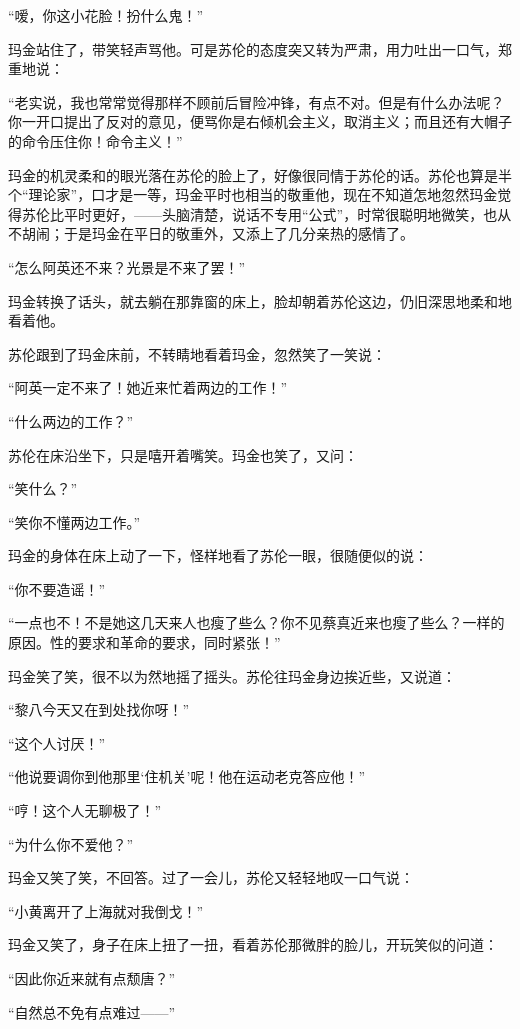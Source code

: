 \par “嗳，你这小花脸！扮什么鬼！”
\par 玛金站住了，带笑轻声骂他。可是苏伦的态度突又转为严肃，用力吐出一口气，郑重地说：
\par “老实说，我也常常觉得那样不顾前后冒险冲锋，有点不对。但是有什么办法呢？你一开口提出了反对的意见，便骂你是右倾机会主义，取消主义；而且还有大帽子的命令压住你！命令主义！”
\par 玛金的机灵柔和的眼光落在苏伦的脸上了，好像很同情于苏伦的话。苏伦也算是半个“理论家”，口才是一等，玛金平时也相当的敬重他，现在不知道怎地忽然玛金觉得苏伦比平时更好，——头脑清楚，说话不专用“公式”，时常很聪明地微笑，也从不胡闹；于是玛金在平日的敬重外，又添上了几分亲热的感情了。
\par “怎么阿英还不来？光景是不来了罢！”
\par 玛金转换了话头，就去躺在那靠窗的床上，脸却朝着苏伦这边，仍旧深思地柔和地看着他。
\par 苏伦跟到了玛金床前，不转睛地看着玛金，忽然笑了一笑说：
\par “阿英一定不来了！她近来忙着两边的工作！”
\par “什么两边的工作？”
\par 苏伦在床沿坐下，只是嘻开着嘴笑。玛金也笑了，又问：
\par “笑什么？”
\par “笑你不懂两边工作。”
\par 玛金的身体在床上动了一下，怪样地看了苏伦一眼，很随便似的说：
\par “你不要造谣！”
\par “一点也不！不是她这几天来人也瘦了些么？你不见蔡真近来也瘦了些么？一样的原因。性的要求和革命的要求，同时紧张！”
\par 玛金笑了笑，很不以为然地摇了摇头。苏伦往玛金身边挨近些，又说道：
\par “黎八今天又在到处找你呀！”
\par “这个人讨厌！”
\par “他说要调你到他那里‘住机关’呢！他在运动老克答应他！”
\par “哼！这个人无聊极了！”
\par “为什么你不爱他？”
\par 玛金又笑了笑，不回答。过了一会儿，苏伦又轻轻地叹一口气说：
\par “小黄离开了上海就对我倒戈！”
\par 玛金又笑了，身子在床上扭了一扭，看着苏伦那微胖的脸儿，开玩笑似的问道：
\par “因此你近来就有点颓唐？”
\par “自然总不免有点难过——”
